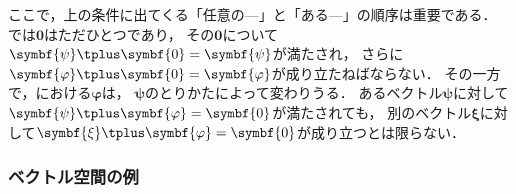 \documentclass[
]{sotsu}
\newcommand{\bpsi}{\symbf{\psi}}
\newcommand{\bphi}{\symbf{\varphi}}
\newcommand{\bxi}{\symbf{\xi}}
\newcommand{\fire}[1]{\textcolor{fire}{#1}}
\newcommand{\water}[1]{\textcolor{water}{#1}}
\begin{document}
ここで，上の条件に出てくる「\fire{任意の}---」と「\water{ある}---」の順序は重要である．
では$\symbf{0}$はただひとつであり，
その$\symbf{0}$について$\bpsi \vecplus \symbf{0} = \bpsi$が満たされ，
さらに$\bphi \vecplus \symbf{0} = \bphi$が成り立たねばならない．
その一方で，における$\bphi$は，
$\bpsi$のとりかたによって変わりうる．
あるベクトル$\bpsi$に対して$\bpsi \vecplus \bphi = \symbf{0}$が満たされても，
別のベクトル$\bxi$に対して$\bxi \vecplus \bphi = \symbf{0}$が成り立つとは限らない．



\subsubsection{ベクトル空間の例}
\label{sec:example-of-vector-space}
\end{document}

